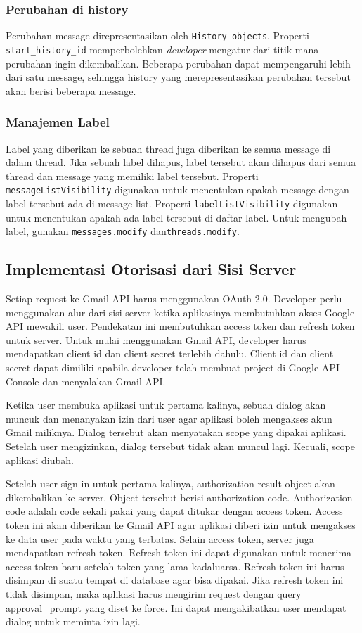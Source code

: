 \subsubsection{Perubahan di history}
Perubahan message direpresentasikan oleh \texttt{History objects}. Properti \texttt{start\_history\_id} memperbolehkan \textit{developer} mengatur dari titik mana perubahan ingin dikembalikan. Beberapa perubahan dapat mempengaruhi lebih dari satu message, sehingga history yang merepresentasikan perubahan tersebut akan berisi beberapa message.

\subsubsection{Manajemen Label}
Label yang diberikan ke sebuah thread juga diberikan ke semua message di dalam thread. Jika sebuah label dihapus, label tersebut akan dihapus dari semua thread dan message yang memiliki label tersebut. Properti \texttt{messageListVisibility} digunakan untuk menentukan apakah message dengan label tersebut ada di message list. Properti \texttt{labelListVisibility} digunakan untuk menentukan apakah ada label tersebut di daftar label. Untuk mengubah label, gunakan \texttt{messages.modify} dan\texttt{threads.modify}.

\subsection{Implementasi Otorisasi dari Sisi Server}
Setiap request ke Gmail API harus menggunakan OAuth 2.0. Developer perlu menggunakan alur dari sisi server ketika aplikasinya membutuhkan akses Google API mewakili user. Pendekatan ini membutuhkan access token dan refresh token untuk server. Untuk mulai menggunakan Gmail API, developer harus mendapatkan client id dan client secret terlebih dahulu. Client id dan client secret dapat dimiliki apabila developer telah membuat project di Google API Console dan menyalakan Gmail API.

Ketika user membuka aplikasi untuk pertama kalinya, sebuah dialog akan muncuk dan menanyakan izin dari user agar aplikasi boleh mengakses akun Gmail miliknya. Dialog tersebut akan menyatakan scope yang dipakai aplikasi. Setelah user mengizinkan, dialog tersebut tidak akan muncul lagi. Kecuali, scope aplikasi diubah.

Setelah user sign-in untuk pertama kalinya, authorization result object akan dikembalikan ke server. Object tersebut berisi authorization code. Authorization code adalah code sekali pakai yang dapat ditukar dengan access token. Access token ini akan diberikan ke Gmail API agar aplikasi diberi izin untuk mengakses ke data user pada waktu yang terbatas. Selain access token, server juga mendapatkan refresh token. Refresh token ini dapat digunakan untuk menerima access token baru setelah token yang lama kadaluarsa. Refresh token ini harus disimpan di suatu tempat di database agar bisa dipakai. Jika refresh token ini tidak disimpan, maka aplikasi harus mengirim request dengan query approval\_prompt yang diset ke force. Ini dapat mengakibatkan user mendapat dialog untuk meminta izin lagi.


